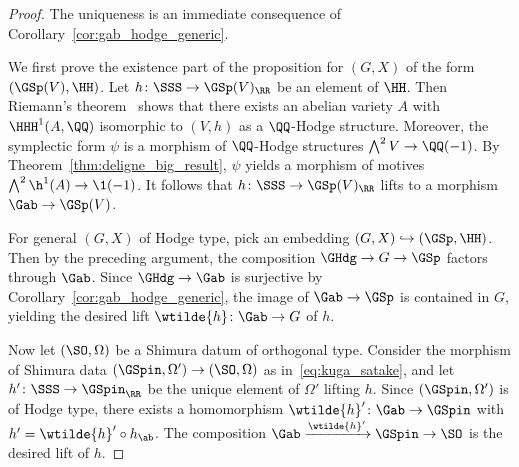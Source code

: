 \begin{proof}
The uniqueness is an immediate consequence of Corollary~\ref{cor:gab_hodge_generic}.

    We first prove the existence part of the proposition for $(G,X)$ of the form $(\GSp(V), \HH)$. Let $h\colon \SSS \rightarrow \GSp(V)_{\RR}$ be an element of $\HH$. Then Riemann's theorem~\cite[Th\'eor\`eme~4.7]{DeligneShimura} shows that there exists an abelian variety $A$ with $\HHH^1(A,\QQ)$ isomorphic to $(V,h)$ as a $\QQ$-Hodge structure. Moreover, the symplectic form $\psi$ is a morphism of $\QQ$-Hodge structures $\bigwedge^2 V \rightarrow \QQ(-1)$. By Theorem~\ref{thm:deligne_big_result}, $\psi$ yields a morphism of motives $\bigwedge^2 \h^1(A) \rightarrow \1(-1)$. It follows that $h\colon \SSS \rightarrow \GSp(V)_{\RR}$ lifts to a morphism $\Gab \rightarrow \GSp(V)$.

For general $(G,X)$ of Hodge type, pick an embedding $(G,X) \hookrightarrow (\GSp,\HH)$. Then by the preceding argument, the composition $\GHdg \rightarrow G \rightarrow \GSp$ factors through $\Gab$. Since $\GHdg \rightarrow \Gab$ is surjective by Corollary~\ref{cor:gab_hodge_generic}, the image of $\Gab \rightarrow \GSp$ is contained in $G$, yielding the desired lift $\wtilde{h}\colon \Gab \rightarrow G$ of $h$.

Now let $(\SO,\Omega)$ be a Shimura datum of orthogonal type. Consider the morphism of Shimura data $(\GSpin,\Omega') \rightarrow (\SO,\Omega)$ as in~\eqref{eq:kuga_satake}, and let $h'\colon \SSS \rightarrow \GSpin_{\RR}$ be the unique element of $\Omega'$ lifting $h$. Since $(\GSpin,\Omega')$ is of Hodge type, there exists a homomorphism $\wtilde{h}' \colon \Gab \rightarrow \GSpin$ with $h' = \wtilde{h}' \circ h_{\ab}$. The composition $\Gab \xrightarrow{\wtilde{h}'} \GSpin \rightarrow \SO$ is the desired lift of $h$.
\end{proof}

